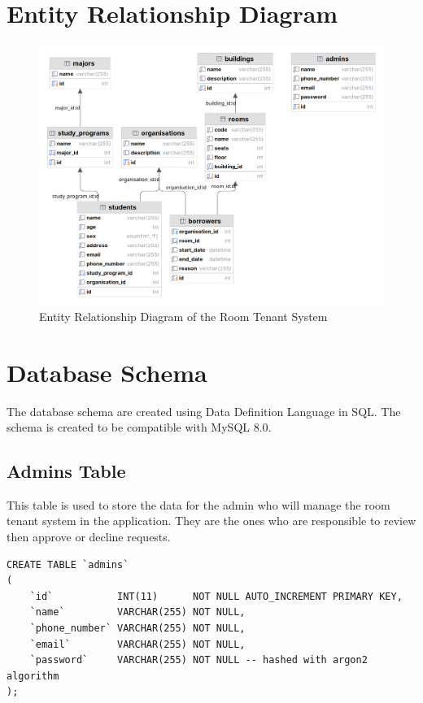 \documentclass[12pt,titlepage]{article}
\begin{document}
\pagebreak

\section{Entity Relationship Diagram}
\begin{figure}[h]
    \centering
    \includegraphics[width=\textwidth]{./images/rts-erd.png}
    \caption{Entity Relationship Diagram of the Room Tenant System}
\end{figure}

\pagebreak

\section{Database Schema}
The database schema are created using Data Definition Language in SQL. 
The schema is created to be compatible with MySQL 8.0.

\subsection{Admins Table}
This table is used to store the data for the admin who will manage the room tenant system in the application.
They are the ones who are responsible to review then approve or decline requests.

\begin{verbatim}
CREATE TABLE `admins`
(
    `id`           INT(11)      NOT NULL AUTO_INCREMENT PRIMARY KEY,
    `name`         VARCHAR(255) NOT NULL,
    `phone_number` VARCHAR(255) NOT NULL,
    `email`        VARCHAR(255) NOT NULL,
    `password`     VARCHAR(255) NOT NULL -- hashed with argon2 algorithm
);
\end{verbatim}
\end{document}
